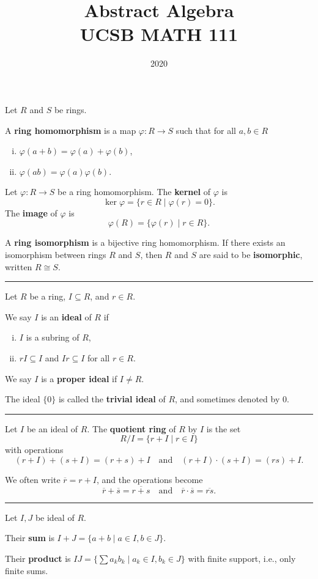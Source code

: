 \documentclass[12pt]{article}
\title{Abstract Algebra\\
    \large UCSB MATH 111
}
\author{}
\date{2020\textendash 2021}
\newcommand{\keyword}[1]{\textbf{#1}}
\newcommand{\sepline}{\rule{\textwidth}{0.4pt}}
\theoremstyle{definition}
\newcommand{\isp}[1]{\quad\text{#1}\quad}
\renewcommand{\phi}{\varphi}
\newcommand{\<}{\left\langle}
\renewcommand{\>}{\right\rangle}
\newcommand{\isom}{\cong}
\newcommand{\eqc}{\overline}
\begin{document}
Let $R$ and $S$ be rings.

A \keyword{ring homomorphism} is a map $\phi : R \to S$ such that for all $a, b \in R$
    \begin{enumerate}[(i)]
        \item $\phi(a + b) = \phi(a) + \phi(b)$,
        \item $\phi(ab) = \phi(a)\phi(b)$.
    \end{enumerate}
    
Let $\phi : R \to S$ be a ring homomorphism. The \keyword{kernel} of $\phi$ is
\[
    \ker \phi = \{r \in R \mid \phi(r) = 0\}.
\]
The \keyword{image} of $\phi$ is
\[
    \phi(R) = \{\phi(r) \mid r \in R\}.
    \]
    
A \keyword{ring isomorphism} is a bijective ring homomorphism. If there exists an isomorphism between rings $R$ and $S$, then $R$ and $S$ are said to be \keyword{isomorphic}, written $R \isom S$.

\sepline

Let $R$ be a ring, $I \subseteq R$, and $r \in R$.

We say $I$ is an \keyword{ideal} of $R$ if
\begin{enumerate}[(i)]
    \item $I$ is a subring of $R$,
    \item $rI \subseteq I$ and $Ir \subseteq I$ for all $r \in R$.
\end{enumerate}

We say $I$ is a \keyword{proper ideal} if $I \ne R$.

The ideal $\{0\}$ is called the \keyword{trivial ideal} of $R$, and sometimes denoted by $0$.

\sepline

Let $I$ be an ideal of $R$. The \keyword{quotient ring} of $R$ by $I$ is the set
\[
    R/I = \{r + I \mid r \in I\}
\]
with operations
\[
    (r+I) + (s+I) = (r+s) + I \isp{and} (r+I) \cdot (s+I) = (rs) + I.
\]

We often write $\eqc{r} = r + I$, and the operations become
\[
    \eqc{r} + \eqc{s} = \eqc{r + s} \isp{and} \eqc{r} \cdot \eqc{s} = \eqc{rs}.
\]

\sepline

Let $I, J$ be ideal of $R$.

Their \keyword{sum} is $I+J = \{a+b \mid a \in I, b \in J\}$.

Their \keyword{product} is $IJ = \{\sum a_kb_k \mid a_k \in I, b_k \in J\}$ with finite support, i.e., only finite sums.
\end{document}
